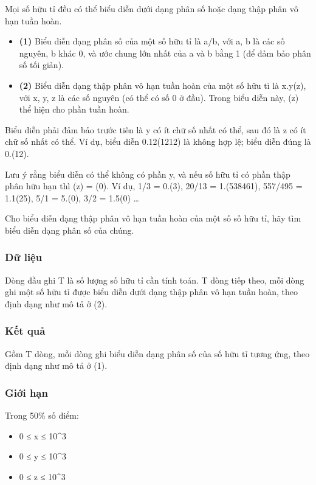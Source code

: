 



   Mọi số hữu tỉ đều có thể biểu diễn dưới dạng phân số hoặc dạng thập phân vô hạn tuần hoàn.  
\begin{itemize}
	\item \textbf{     (1)    }    Biểu diễn dạng phân số của một số hữu tỉ là a/b, với a, b là các số nguyên, b khác 0, và ước chung lớn nhất của a và b bằng 1 (để đảm bảo phân số tối giản).   
	\item \textbf{     (2)    }    Biểu diễn dạng thập phân vô hạn tuần hoàn của một số hữu tỉ là x.y(z), với x, y, z là các số nguyên (có thể có số 0 ở đầu). Trong biểu diễn này, (z) thể hiện cho phần tuần hoàn.   
\end{itemize}

   Biểu diễn phải đảm bảo trước tiên là y có ít chữ số nhất có thể, sau đó là z có ít chữ số nhất có thể. Ví dụ, biểu diễn 0.12(1212) là không hợp lệ; biểu diễn đúng là 0.(12).  

   Lưu ý rằng biểu diễn có thể không có phần y, và nếu số hữu tỉ có phần thập phân hữu hạn thì (z) = (0). Ví dụ, 1/3 = 0.(3), 20/13 = 1.(538461), 557/495 = 1.1(25), 5/1 = 5.(0), 3/2 = 1.5(0) …  

   Cho biểu diễn dạng thập phân vô hạn tuần hoàn của một số số hữu tỉ, hãy tìm biểu diễn dạng phân số của chúng.  

\subsubsection{   Dữ liệu  }

   Dòng đầu ghi T là số lượng số hữu tỉ cần tính toán. T dòng tiếp theo, mỗi dòng ghi một số hữu tỉ được biểu diễn dưới dạng thập phân vô hạn tuần hoàn, theo định dạng như mô tả ở (2).  

\subsubsection{   Kết quả  }

   Gồm T dòng, mỗi dòng ghi biểu diễn dạng phân số của số hữu tỉ tương ứng, theo định dạng như mô tả ở (1).  

\subsubsection{   Giới hạn  }

   Trong 50\% số điểm:  
\begin{itemize}
	\item     0 ≤ x ≤ 10^3   
	\item     0 ≤ y ≤ 10^3   
	\item     0 ≤ z ≤ 10^3   
\end{itemize}

